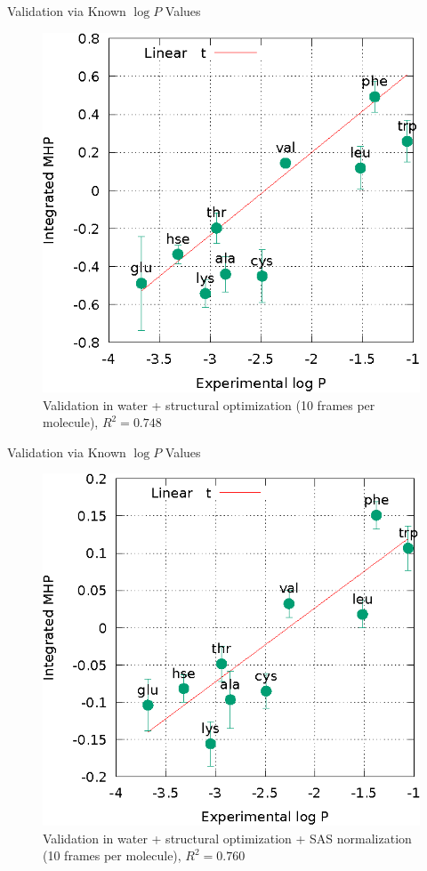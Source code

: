 \documentclass{beamer}
\begin{document}
\begin{frame}{Validation via Known $\log P$ Values}
	\centering
	\begin{figure}[h!]
		\caption{Validation in water + structural optimization (10 frames per molecule), $R^{2}=0.748$}
		\includegraphics[scale=0.75]{graph_zwitterions_water.eps}
	\end{figure}
\end{frame}
\begin{frame}{Validation via Known $\log P$ Values}
	\centering
	\begin{figure}[h!]
		\caption{Validation in water + structural optimization + SAS normalization (10 frames per molecule), $R^{2}=0.760$}
		\includegraphics[scale=0.75]{graph_zwitterions_normalized.eps}
	\end{figure}
\end{frame}
\end{document}

